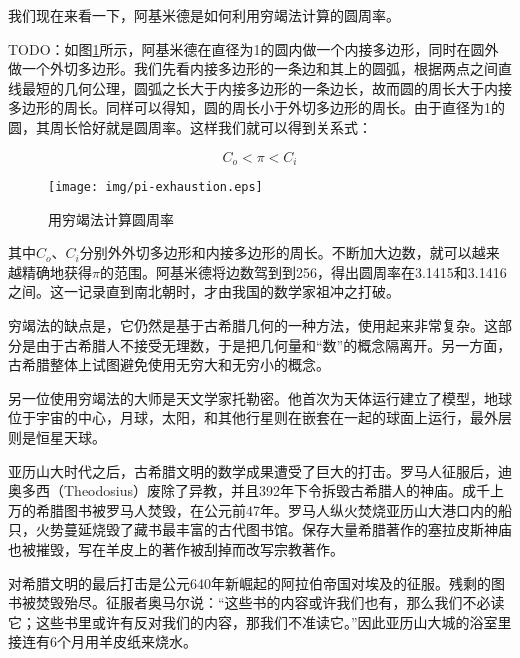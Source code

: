 \documentclass{article}
\begin{document}
我们现在来看一下，阿基米德是如何利用穷竭法计算的圆周率。

TODO：如图\ref{fig:pi-exhaustion}所示，阿基米德在直径为1的圆内做一个内接多边形，同时在圆外做一个外切多边形。我们先看内接多边形的一条边和其上的圆弧，根据两点之间直线最短的几何公理，圆弧之长大于内接多边形的一条边长，故而圆的周长大于内接多边形的周长。同样可以得知，圆的周长小于外切多边形的周长。由于直径为1的圆，其周长恰好就是圆周率。这样我们就可以得到关系式：

\[
  C_o < \pi < C_i
\]

\begin{figure}[htbp]
 \centering
 \texttt{[image: img/pi-exhaustion.eps]}
 \caption{用穷竭法计算圆周率}
 \label{fig:pi-exhaustion}
\end{figure}

其中$C_o$、$C_i$分别外外切多边形和内接多边形的周长。不断加大边数，就可以越来越精确地获得$\pi$的范围。阿基米德将边数驾到到256，得出圆周率在3.1415和3.1416之间。这一记录直到南北朝时，才由我国的数学家祖冲之打破。

穷竭法的缺点是，它仍然是基于古希腊几何的一种方法，使用起来非常复杂。这部分是由于古希腊人不接受无理数，于是把几何量和“数”的概念隔离开。另一方面，古希腊整体上试图避免使用无穷大和无穷小的概念。

另一位使用穷竭法的大师是天文学家托勒密。他首次为天体运行建立了模型，地球位于宇宙的中心，月球，太阳，和其他行星则在嵌套在一起的球面上运行，最外层则是恒星天球。

亚历山大时代之后，古希腊文明的数学成果遭受了巨大的打击。罗马人征服后，迪奥多西（Theodosius）废除了异教，并且392年下令拆毁古希腊人的神庙。成千上万的希腊图书被罗马人焚毁，在公元前47年。罗马人纵火焚烧亚历山大港口内的船只，火势蔓延烧毁了藏书最丰富的古代图书馆。保存大量希腊著作的塞拉皮斯神庙也被摧毁，写在羊皮上的著作被刮掉而改写宗教著作。

对希腊文明的最后打击是公元640年新崛起的阿拉伯帝国对埃及的征服。残剩的图书被焚毁殆尽。征服者奥马尔说：“这些书的内容或许我们也有，那么我们不必读它；这些书里或许有反对我们的内容，那我们不准读它。”因此亚历山大城的浴室里接连有6个月用羊皮纸来烧水\cite{M-Kline-2007}。
\end{document}
